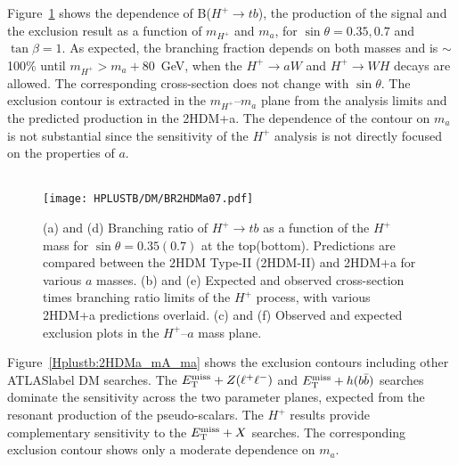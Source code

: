 Figure~\ref{Hplustb:BRprodexclmassvsmass} shows the dependence of B($H^+\to tb$), the production of the signal and the exclusion result as a function of $m_{H^+}$ and $m_a$, for $\sin\theta=0.35,0.7$ and $\tan\beta=1$. As expected, the branching fraction depends on both masses and is $\sim$100\% until $m_{H^+} > m_a+80$~GeV, when the $H^+\to aW$ and $H^+\to WH$ decays are allowed. The corresponding cross-section does not change with $\sin\theta$. The exclusion contour is extracted in the $m_{H^+}$--$m_a$ plane from the analysis limits and the predicted production in the 2HDM+a. The dependence of the contour on $m_a$ is not substantial since the sensitivity of the $H^+$ analysis is not directly focused on the properties of $a$.\\

\begin{figure}[htb]
    \RawFloats
    \centering
        \\
       {\texttt{[image: HPLUSTB/DM/BR2HDMa07.pdf]}} 
    \caption{(a) and (d) Branching ratio of $H^+\to tb$ as a function of the $H^+$ mass for $\sin\theta=0.35(0.7)$ at the top(bottom). Predictions are compared between the 2HDM Type-II (2HDM-II) and 2HDM+a for various $a$ masses. (b) and (e) Expected and observed cross-section times branching ratio limits of the $H^+$ process, with various 2HDM+a predictions overlaid. (c) and (f) Observed and expected exclusion plots in the $H^+$--$a$ mass plane.}
    \label{Hplustb:BRprodexclmassvsmass}
\end{figure}

Figure~\ref{Hplustb:2HDMa_mA_ma} shows the exclusion contours including other \acrshort{ATLASlabel} DM searches. The $E_{\text{T}}^{\text{miss}}+ Z(\ell^+\ell^-)$ and $E_{\text{T}}^{\text{miss}}+ h(b\bar{b})$ searches dominate the sensitivity across the two parameter planes, expected from the resonant production of the pseudo-scalars. The $H^+$ results provide complementary sensitivity to the $E_{\text{T}}^{\text{miss}}+ X$ searches. The corresponding exclusion contour shows only a moderate dependence on $m_a$.\\

